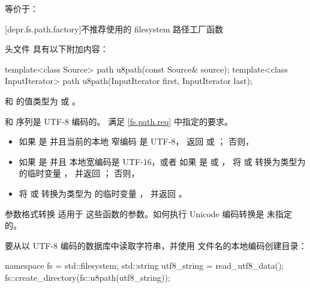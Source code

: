 \begin{itemdescr}
\pnum
\effects
等价于：
\end{itemdescr}

[depr.fs.path.factory]{不推荐使用的 filesystem 路径工厂函数}

\pnum
头文件  具有以下附加内容：

%
\begin{itemdecl}
template<class Source>
  path u8path(const Source& source);
template<class InputIterator>
  path u8path(InputIterator first, InputIterator last);
\end{itemdecl}

\begin{itemdescr}
\pnum
\mandates
{} 和  的值类型为
 或 。

\pnum
\expects
{} 和  序列是 UTF-8 编码的。
 满足 \ref{fs.path.req} 中指定的要求。

\pnum
\returns
\begin{itemize}
\item 如果  是  并且当前的本地
      窄编码 是 UTF-8，
      返回  或 ；
      否则，
\item 如果  是  并且
      本地宽编码是 UTF-16，或者
      如果  是  或 ，
      将  或 
      转换为类型为  的临时变量 ，
      并返回 ；
      否则，
\item 将  或 
      转换为类型为  的临时变量 ，
      并返回 。
\end{itemize}

\pnum
\remarks
参数格式转换 适用于
  这些函数的参数。如何执行 Unicode 编码转换是
  未指定的。

\pnum
\begin{example}
要从以 UTF-8 编码的数据库中读取字符串，并使用
    文件名的本地编码创建目录：
\begin{codeblock}
namespace fs = std::filesystem;
std::string utf8_string = read_utf8_data();
fs::create_directory(fs::u8path(utf8_string));
\end{codeblock}


\end{example}
\end{itemdescr}
